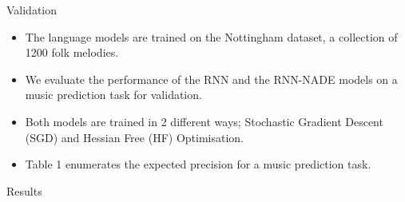\documentclass[final]{beamer}
\newlength{\onecolwid}
\newlength{\twocolwid}
\begin{document}
\begin{frame}[t]
\begin{columns}[t]
\begin{column}{\twocolwid}
\begin{columns}[t,totalwidth=\twocolwid]
\begin{column}{\onecolwid}\vspace{-.6in} %


\begin{block}{Validation}

\begin{table}[t]
 \begin{center}
\end{center} 
\caption{Validation results for MLMs}
\end{table}

\begin{itemize}
\item The language models are trained on the Nottingham dataset, a collection of 1200 folk melodies. 
\item We evaluate the performance of the RNN and the RNN-NADE models on a music prediction task for validation. 
\item Both models are trained in 2 different ways; Stochastic Gradient Descent (SGD) and Hessian Free (HF) Optimisation.
\item Table 1 enumerates the expected precision for a music prediction task. 
\end{itemize}
\end{block}


\begin{block}{Results}


\end{block}
\end{column}
\end{columns}
\end{column}
\end{columns}
\end{frame}
\end{document}
